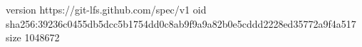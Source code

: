 version https://git-lfs.github.com/spec/v1
oid sha256:39236c0455db5dcc5b1754dd0c8ab9f9a9a82b0e5cddd2228ed35772a9f4a517
size 1048672
